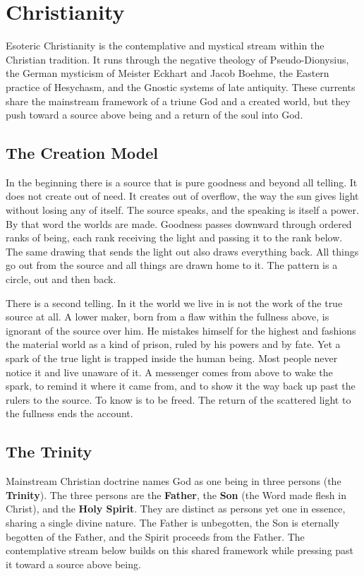 \section{Christianity}

Esoteric Christianity is the contemplative and mystical stream within the
Christian tradition. It runs through the negative theology of Pseudo-Dionysius,
the German mysticism of Meister Eckhart and Jacob Boehme, the Eastern practice
of Hesychasm, and the Gnostic systems of late antiquity. These currents share
the mainstream framework of a triune God and a created world, but they push
toward a source above being and a return of the soul into God.

\subsection{The Creation Model}

In the beginning there is a source that is pure goodness and beyond all
telling. It does not create out of need. It creates out of overflow, the way
the sun gives light without losing any of itself. The source speaks, and the
speaking is itself a power. By that word the worlds are made. Goodness passes
downward through ordered ranks of being, each rank receiving the light and
passing it to the rank below. The same drawing that sends the light out also
draws everything back. All things go out from the source and all things are
drawn home to it. The pattern is a circle, out and then back.

There is a second telling. In it the world we live in is not the work of the
true source at all. A lower maker, born from a flaw within the fullness above,
is ignorant of the source over him. He mistakes himself for the highest and
fashions the material world as a kind of prison, ruled by his powers and by
fate. Yet a spark of the true light is trapped inside the human being. Most
people never notice it and live unaware of it. A messenger comes from above to
wake the spark, to remind it where it came from, and to show it the way back up
past the rulers to the source. To know is to be freed. The return of the
scattered light to the fullness ends the account.

\subsection{The Trinity}

Mainstream Christian doctrine names God as one being in three persons (the
\textbf{Trinity}). The three persons are the \textbf{Father}, the \textbf{Son}
(the Word made flesh in Christ), and the \textbf{Holy Spirit}. They are
distinct as persons yet one in essence, sharing a single divine nature. The
Father is unbegotten, the Son is eternally begotten of the Father, and the
Spirit proceeds from the Father. The contemplative stream below builds on this
shared framework while pressing past it toward a source above being.

